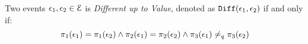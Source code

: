 %
%
%
\begin{defn}
Two events $\mathtt{\epsilon}_1, \mathtt{\epsilon}_2 \in \mathcal{E}$ is \emph{Different up to Value}, 
denoted as $\mathtt{Diff}(\mathtt{\epsilon}_1, \mathtt{\epsilon}_2)$ if and only if:
\[
\pi_1(\mathtt{\epsilon}_1) = \pi_1(\mathtt{\epsilon}_2) 
\land  
\pi_2(\mathtt{\epsilon}_1) = \pi_2(\mathtt{\epsilon}_2) 
\land  
\pi_3(\mathtt{\epsilon}_1) \neq_q \pi_3(\mathtt{\epsilon}_2)
\]
\end{defn}
%
%
%